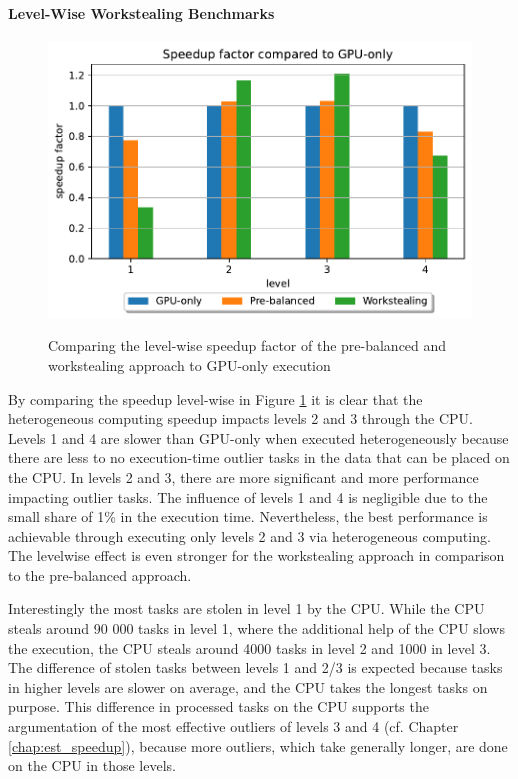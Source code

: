\paragraph{Level-Wise Workstealing Benchmarks}
\begin{figure}[H]
  \caption{Comparing the level-wise speedup factor of the pre-balanced and workstealing approach to GPU-only execution}
  \includegraphics[width=\textwidth]{figures/levelwise.pdf}
  \centering
  \label{fig:levelwise_delos}
\end{figure}

By comparing the speedup level-wise in Figure \ref{fig:levelwise_delos} it is clear that the heterogeneous computing speedup impacts levels 2 and 3 through the CPU. Levels 1 and 4 are slower than GPU-only when executed heterogeneously because there are less to no execution-time outlier tasks in the data that can be placed on the CPU. In levels 2 and 3, there are more significant and more performance impacting outlier tasks. The influence of levels 1 and 4 is negligible due to the small share of 1\% in the execution time. Nevertheless, the best performance is achievable through executing only levels 2 and 3 via heterogeneous computing. The levelwise effect is even stronger for the workstealing approach in comparison to the pre-balanced approach.

Interestingly the most tasks are stolen in level 1 by the CPU. While the CPU steals around 90 000 tasks in level 1, where the additional help of the CPU slows the execution, the CPU steals around 4000 tasks in level 2 and 1000 in level 3. The difference of stolen tasks between levels 1 and 2/3 is expected because tasks in higher levels are slower on average, and the CPU takes the longest tasks on purpose. This difference in processed tasks on the CPU supports the argumentation of the most effective outliers of levels 3 and 4 (cf. Chapter \ref{chap:est_speedup}), because more outliers, which take generally longer, are done on the CPU in those levels.

